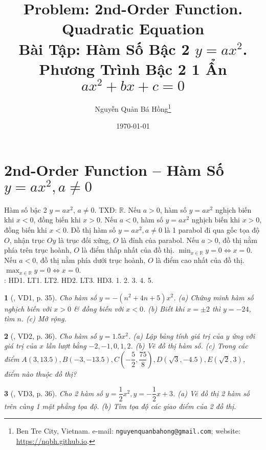 \documentclass{article}
\title{Problem: 2nd-Order Function. Quadratic Equation\\Bài Tập: Hàm Số Bậc 2 $y = ax^2$. Phương Trình Bậc 2 1 Ẩn $ax^2 + bx + c = 0$}
\author{Nguyễn Quản Bá Hồng\footnote{Ben Tre City, Vietnam. e-mail: \texttt{nguyenquanbahong@gmail.com}; website: \url{https://nqbh.github.io}.}}
\date{\today}
\newtheorem{baitoan}{}
\begin{document}
\maketitle
\tableofcontents


\section{2nd-Order Function -- Hàm Số $y = ax^2,a\ne0$}
 Hàm số bậc 2 $y = ax^2$, $a\ne0$. TXĐ: $\mathbb{R}$. Nếu $a > 0$, hàm số $y = ax^2$ nghịch biến khi $x < 0$, đồng biến khi $x > 0$. Nếu $a < 0$, hàm số $y = ax^2$ nghịch biến khi $x > 0$, đồng biến khi $x < 0$.  Đồ thị hàm số $y = ax^2,a\ne0$ là 1 parabol đi qua gốc tọa độ $O$, nhận trục $Oy$ là trục đối xứng, $O$ là đỉnh của parabol. Nếu $a > 0$, đồ thị nằm phía trên trục hoành, $O$ là điểm thấp nhất của đồ thị. $\min_{x\in\mathbb{R}} y = 0\Leftrightarrow x = 0$. Nếu $a < 0$, đồ thị nằm phía dưới trục hoành, $O$ là điểm cao nhất của đồ thị. $\max_{x\in\mathbb{R}} y = 0\Leftrightarrow x = 0$.\\

\noindent\cite[Chap. VII, \S1, pp. 46--51]{SGK_Toan_9_Canh_Dieu_tap_2}: HD1. LT1. LT2. HD2. LT3. HD3. 1. 2. 3. 4. 5.

\begin{baitoan}[\cite{Binh_boi_duong_Toan_9_tap_2}, VD1, p. 35]
	Cho hàm số $y = -(n^2 + 4n + 5)x^2$. (a) Chứng minh hàm số nghịch biến với $x > 0$ \& đồng biến với $x < 0$. (b) Biết khi $x = \pm2$ thì $y = -24$, tìm $n$. (c) Mở rộng.
\end{baitoan}

\begin{baitoan}[\cite{Binh_boi_duong_Toan_9_tap_2}, VD2, p. 36]
	Cho hàm số $y = 1.5x^2$. (a) Lập bảng tính giá trị của $y$ ứng với giá trị của $x$ lần lượt bằng $-2,-1,0,1,2$. (b) Vẽ đồ thị hàm số. (c) Trong các điểm $A(3,13.5),B(-3,-13.5),C\left(-\dfrac{5}{2},\dfrac{75}{8}\right),D(\sqrt{3},-4.5),E(\sqrt{2},3)$, điểm nào thuộc đồ thị?
\end{baitoan}

\begin{baitoan}[\cite{Binh_boi_duong_Toan_9_tap_2}, VD3, p. 36]
	Cho 2 hàm số $y = \dfrac{1}{2}x^2,y = -\dfrac{1}{2}x + 3$. (a) Vẽ đồ thị 2 hàm số trên cùng 1 mặt phẳng tọa độ. (b) Tìm tọa độ các giao điểm của 2 đồ thị.
\end{baitoan}
\end{document}
